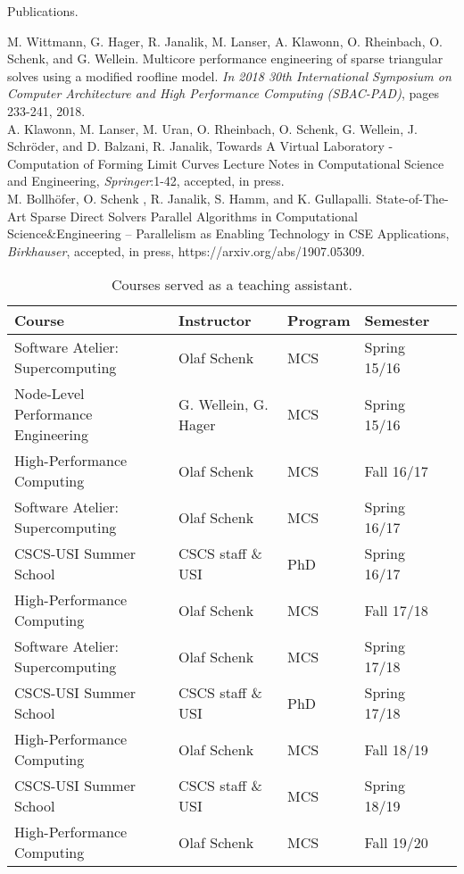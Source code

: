 \begin{table}
\caption{Publications.}
\label{tab:publications}
M. Wittmann, G. Hager, R. Janalik, M. Lanser, A. Klawonn, O. Rheinbach, O. Schenk, and G. Wellein. Multicore performance engineering of sparse triangular solves using a modified roofline model. \textit{In 2018 30th International Symposium on Computer Architecture and High Performance Computing (SBAC-PAD)}, pages 233-241, 2018.
\vspace{0.5em} \\
A. Klawonn, M. Lanser, M. Uran, O. Rheinbach, O. Schenk, G. Wellein, J. Schr\"oder, and D. Balzani, R. Janalik,
Towards A Virtual Laboratory - Computation of Forming Limit Curves
Lecture Notes in Computational Science and Engineering, \textit{Springer}:1-42, accepted, in press.
\vspace{0.5em} \\
M. Bollh\"ofer, O. Schenk , R. Janalik, S. Hamm, and K. Gullapalli.
State-of-The-Art Sparse Direct Solvers
Parallel Algorithms in Computational Science&Engineering -- Parallelism as Enabling Technology in CSE Applications, \textit{Birkhauser}, accepted, in press, https://arxiv.org/abs/1907.05309.
\vspace{0.2em}
\hline
\end{table}

\begin{table}[h!]
\centering
\caption{Courses served as a teaching assistant.}
\label{tab:ta}
\begin{tabular}{lllll}
\hline
Course                               & Instructor             & Program & Semester  \\ \hline
Software Atelier: Supercomputing & Olaf Schenk & MCS & Spring 15/16 \\
Node-Level Performance Engineering & G. Wellein, G. Hager & MCS & Spring 15/16 \\
High-Performance Computing & Olaf Schenk & MCS & Fall 16/17 \\
Software Atelier: Supercomputing & Olaf Schenk & MCS & Spring 16/17 \\
CSCS-USI Summer School & CSCS staff \& USI & PhD & Spring 16/17 \\
High-Performance Computing & Olaf Schenk & MCS & Fall 17/18 \\
Software Atelier: Supercomputing & Olaf Schenk & MCS & Spring 17/18 \\
CSCS-USI Summer School & CSCS staff \& USI & PhD & Spring 17/18 \\
High-Performance Computing & Olaf Schenk & MCS & Fall 18/19 \\
CSCS-USI Summer School & CSCS staff \& USI & MCS & Spring 18/19 \\
High-Performance Computing & Olaf Schenk & MCS & Fall 19/20	\\ \hline
 \hline
\end{tabular}
\end{table}

